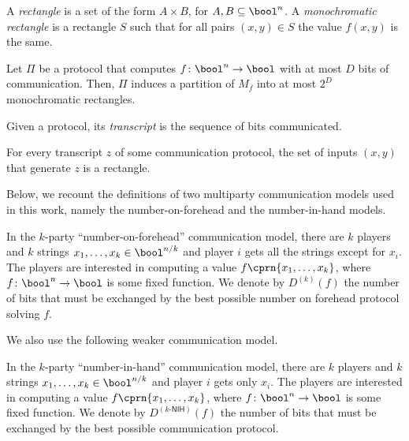 	\begin{definition}
	    A \emph{rectangle} is a set of the form $A\times B$, for $A,B\subseteq\bool^n$. A \emph{monochromatic rectangle} is a rectangle $S$ such that for all pairs $(x,y)\in S$ the value $f(x,y)$ is the same.
    \end{definition}
	
	\begin{lemma}
	    Let $\Pi$ be a protocol that computes $f\colon\bool^{n}\to\bool$ with at most $D$ bits of communication. Then, $\Pi$ induces a partition of $M_f$ into at most $2^D$ monochromatic rectangles.
	\end{lemma}
	
	Given a protocol, its \emph{transcript} is the sequence of bits communicated.
	
	\begin{lemma}
	    For every transcript $z$ of some communication protocol, the set of inputs $(x,y)$ that generate $z$ is a rectangle.
	\end{lemma}
	
%
%
%
	
%
%
%

    Below, we recount the definitions of two multiparty communication models used in this work, namely the number-on-forehead and the number-in-hand models.
	
	\begin{definition}
	    In the $k$-party ``number-on-forehead'' communication model, 
%
	    there are $k$ players and $k$ strings $x_1,\dots,x_k\in\bool^{n/k}$ and player $i$ gets all the strings except for $x_i$. The players are interested in computing a value $f\cprn{x_1,\dots,x_k}$, where $f\colon\bool^{n}\to\bool$ is some fixed function. 
%
	    We denote by $D^{(k)}(f)$ the number of bits that must be exchanged by the best possible number on forehead protocol solving $f$.
    \end{definition}
        
%
    
    We also use the following weaker communication model.
    
    \begin{definition}
	    In the $k$-party ``number-in-hand'' communication model,
%
	    there are $k$ players and $k$ strings $x_1,\dots,x_k\in\bool^{n/k}$ and player $i$ gets only $x_i$.
%
	    The players are interested in computing a value $f\cprn{x_1,\dots,x_k}$, where $f\colon\bool^{n}\to\bool$ is some fixed function.
%
	    We denote by $D^{(k\text{-}\mathsf{NIH})}(f)$ the number of bits that must be exchanged by the best possible communication protocol.
    \end{definition}
    

